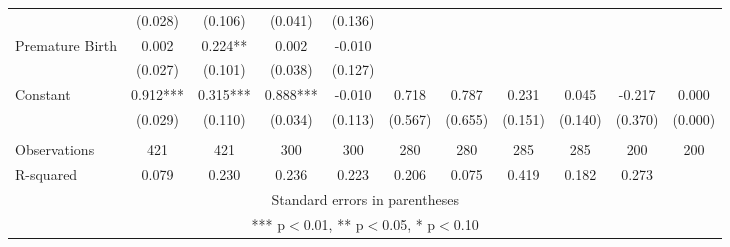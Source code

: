 \begin{tabular}{lcccccccccc}
 & (0.028) & (0.106) & (0.041) & (0.136) &  &  &  &  &  &  \\
Premature Birth & 0.002 & 0.224** & 0.002 & -0.010 &  &  &  &  &  &  \\
 & (0.027) & (0.101) & (0.038) & (0.127) &  &  &  &  &  &  \\
Constant & 0.912*** & 0.315*** & 0.888*** & -0.010 & 0.718 & 0.787 & 0.231 & 0.045 & -0.217 & 0.000 \\
 & (0.029) & (0.110) & (0.034) & (0.113) & (0.567) & (0.655) & (0.151) & (0.140) & (0.370) & (0.000) \\
 &  &  &  &  &  &  &  &  &  &  \\
Observations & 421 & 421 & 300 & 300 & 280 & 280 & 285 & 285 & 200 & 200 \\
 R-squared & 0.079 & 0.230 & 0.236 & 0.223 & 0.206 & 0.075 & 0.419 & 0.182 & 0.273 &  \\ \hline
\multicolumn{11}{c}{ Standard errors in parentheses} \\
\multicolumn{11}{c}{ *** p$<$0.01, ** p$<$0.05, * p$<$0.10} \\
\end{tabular}
